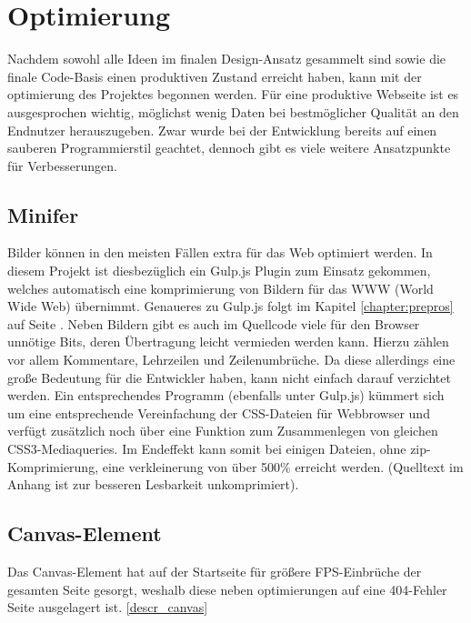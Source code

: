 \section{Optimierung}
Nachdem sowohl alle Ideen im finalen Design-Ansatz gesammelt sind sowie die finale Code-Basis einen produktiven Zustand erreicht haben, kann mit der optimierung des Projektes begonnen werden. Für eine produktive Webseite ist es ausgesprochen wichtig, möglichst wenig Daten bei bestmöglicher Qualität an den Endnutzer herauszugeben. Zwar wurde bei der Entwicklung bereits auf einen sauberen Programmierstil geachtet, dennoch gibt es viele weitere Ansatzpunkte für Verbesserungen.

\subsection{Minifer}
Bilder können in den meisten Fällen extra für das Web optimiert werden. In diesem Projekt ist diesbezüglich ein Gulp.js Plugin zum Einsatz gekommen, welches automatisch eine komprimierung von Bildern für das WWW (World Wide Web) übernimmt. Genaueres zu Gulp.js folgt im Kapitel \ref{chapter:prepros} auf Seite \pageref{chapter:prepros}.
Neben Bildern gibt es auch im Quellcode viele für den Browser unnötige Bits, deren Übertragung leicht vermieden werden kann. Hierzu zählen vor allem Kommentare, Lehrzeilen und Zeilenumbrüche. Da diese allerdings eine große Bedeutung für die Entwickler haben, kann nicht einfach darauf verzichtet werden. Ein entsprechendes Programm (ebenfalls unter Gulp.js) kümmert sich um eine entsprechende Vereinfachung der CSS-Dateien für Webbrowser und verfügt zusätzlich noch über eine Funktion zum Zusammenlegen von gleichen CSS3-Mediaqueries. Im Endeffekt kann somit bei einigen Dateien, ohne zip-Komprimierung, eine verkleinerung von über 500\% erreicht werden. (Quelltext im Anhang ist zur besseren Lesbarkeit unkomprimiert).

\subsection{Canvas-Element}
Das Canvas-Element hat auf der Startseite für größere FPS-Einbrüche der gesamten Seite gesorgt, weshalb diese neben optimierungen auf eine 404-Fehler Seite ausgelagert ist. \ref{descr_canvas}